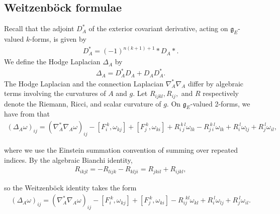 \documentclass[12pt]{amsart}
\renewcommand{\1}{{\mathbf 1}}
\theoremstyle{others}
\numberwithin{equation}{section}
\begin{document}
\subsection{Weitzenb{\"o}ck formulae} Recall that the adjoint \(D_A^\ast\) of the exterior covariant derivative, acting on \(\mathfrak{g}_E\)-valued \(k\)-forms, is given by
\begin{align*}
    D_A^\ast = (-1)^{n(k+1)+1} \ast D_A \ast.
\end{align*} We define the Hodge Laplacian \(\Delta_A\) by 
\begin{align*}
    \Delta_A = D_A^\ast D_A + D_A D_A^\ast.
\end{align*} The Hodge Laplacian and the connection Laplacian \(\nabla_A^\ast \nabla_A\) differ by algebraic terms involving the curvatures of \(A\) and \(g\). Let $R_{ijkl}, R_{ij},$ and $R$ respectively denote the Riemann, Ricci, and scalar curvature of $g.$ On \(\mathfrak{g}_E\)-valued 2-forms, we have from \cite[(4.6)]{oliveirawaldron} that
\begin{align*}
    (\Delta_A \omega)_{ij} = (\nabla_A^\ast \nabla_A \omega)_{ij} - [F_i^{\ k}, \omega_{kj}] + [F_j^{\ k}, \omega_{ki}] + R_{i \ j}^{\ k \ l}\omega_{lk} - R_{j \ i}^{\ k \ l}\omega_{lk} + R_i^{\ l}\omega_{lj} + R_j^{\ l}\omega_{il},
\end{align*}

 where we use the Einstein summation convention of summing over repeated indices. By the algebraic Bianchi identity,
 \begin{align*}
    R_{ikjl} = - R_{lijk} - R_{klji} = R_{jkil} + R_{ijkl},
\end{align*}

 so the Weitzenb{\"o}ck identity takes the form
\begin{align*}
    (\Delta_A \omega)_{ij} = (\nabla_A^\ast \nabla_A \omega)_{ij}
    - [F_i^{\ k}, \omega_{kj}] + [F_j^{\ k}, \omega_{ki}] - R_{ij}^{\ \ kl}\omega_{kl} + R_i^{\ l}\omega_{lj} + R_j^{\ l}\omega_{il}.
\end{align*} \par
\end{document}
